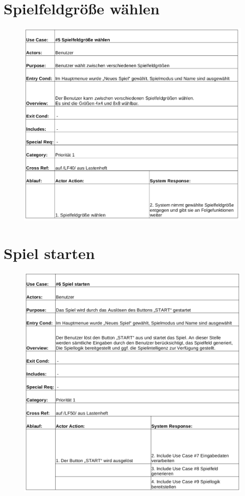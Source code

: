 \clearpage
\section{Spielfeldgröße wählen}
\begin{figure}[!h]
	\centering
    \includegraphics[width=\textwidth]{./ucbSpielfeldgroesse.png}
	\label{}
\end{figure}

\clearpage
\section{Spiel starten}
\begin{figure}[!h]
	\centering
    \includegraphics[width=\textwidth]{./ucbSpielStarten.png}
	\label{}
\end{figure}
